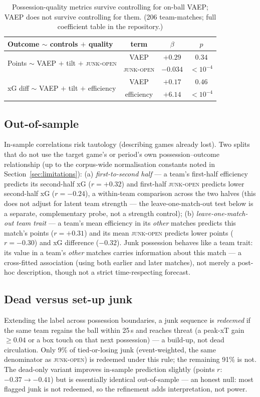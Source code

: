 \documentclass[11pt]{article}
\newcommand{\junk}{\textsc{junk-open}}
\begin{document}
\begin{table}[t]
\centering
\small
\begin{tabular}{lccc}
\toprule
Outcome $\sim$ controls $+$ quality & term & $\beta$ & $p$ \\
\midrule
\multirow{2}{*}{Points $\sim$ VAEP $+$ tilt $+$ \junk{}}
  & VAEP  & $+0.29$ & $0.34$ \\
  & \junk{} & $-0.034$ & $<10^{-4}$ \\
\midrule
\multirow{2}{*}{xG diff $\sim$ VAEP $+$ tilt $+$ efficiency}
  & VAEP       & $+0.17$ & $0.46$ \\
  & efficiency & $+6.14$ & $<10^{-4}$ \\
\bottomrule
\end{tabular}
\caption{Possession-quality metrics survive controlling for on-ball VAEP; VAEP
does not survive controlling for them. (206 team-matches; full coefficient
table in the repository.)}
\label{tab:vaep}
\end{table}

\subsection{Out-of-sample}
In-sample correlations risk tautology (describing games already lost). Two
splits that do not use the target game's or period's own possession--outcome
relationship (up to the corpus-wide normalisation constants noted in
Section~\ref{sec:limitations}): (a) \emph{first-to-second
half} --- a team's first-half efficiency predicts its second-half xG
($r=+0.32$) and first-half \junk{} predicts lower second-half xG ($r=-0.24$),
a within-team comparison across the two halves (this does not adjust for latent
team strength --- the leave-one-match-out test below is a separate, complementary
probe, not a strength control); (b)
\emph{leave-one-match-out team trait} --- a team's mean efficiency in its
\emph{other} matches predicts this match's points ($r=+0.31$) and its mean
\junk{} predicts lower points ($r=-0.30$) and xG difference ($-0.32$).
Junk possession behaves like a team trait: its value in a team's \emph{other}
matches carries information about this match --- a cross-fitted association (using
both earlier and later matches), not merely a post-hoc description, though not a
strict time-respecting forecast.

\subsection{Dead versus set-up junk}
Extending the label across possession boundaries, a junk sequence is
\emph{redeemed} if the same team regains the ball within 25\,s and reaches
threat (a peak-xT gain $\ge 0.04$ or a box touch on that next possession) ---
a build-up, not dead circulation. Only 9\% of tied-or-losing junk (event-weighted,
the same denominator as \junk{}) is redeemed under this rule; the remaining 91\% is not. The
dead-only variant improves in-sample
prediction slightly (points $r$: $-0.37 \to -0.41$) but is essentially
identical out-of-sample --- an honest null: most flagged junk is not redeemed,
so the refinement adds interpretation, not power.
\end{document}
